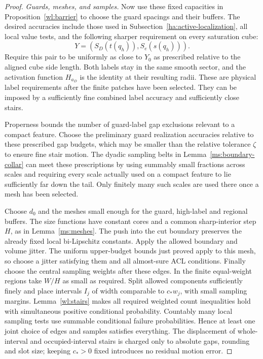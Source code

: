 \documentclass[11pt]{article}
\numberwithin{equation}{section}
\theoremstyle{definition}
\theoremstyle{remark}
\begin{document}
\begin{proof}
\emph{Guards, meshes, and samples.}
Now use these fixed capacities in Proposition~\ref{wl:barrier} to choose
the guard spacings and their buffers.  The desired accuracies include
those used in Subsection~\ref{ha:active-localization}, all local value tests,
and the following sharper requirement on every saturation cube:
\begin{equation}\label{ha:sharp-label-pinning}
                  Y=(S_D(t(q_h)),S_e(s(q_h))).
\end{equation}
Require this pair to be uniformly as close to $Y_0$ as prescribed
relative to the aligned cube side length.  Both labels stay in the
same smooth sector, and the activation
function $H_{a_D}$ is the identity at their resulting radii.
These are physical label requirements after the finite patches
have been selected.  They can be imposed by a sufficiently fine
combined label accuracy and sufficiently close stairs.

Properness bounds the number of guard-label gap exclusions relevant
to a compact feature.  Choose the preliminary guard realization
accuracies relative to these prescribed gap budgets, which may be
smaller than the relative tolerance $\zeta$ to ensure fine stair
motion.  The dyadic sampling belts in
Lemma~\ref{ms:boundary-collar} can meet these prescriptions by
using summably small fractions across scales and requiring every
scale actually used on a compact feature to lie sufficiently far
down the tail.  Only finitely many such scales are used there
once a mesh has been selected.

Choose $d_0$ and the meshes small enough for the guard, high-label
and regional buffers.  The size functions have constant cores and
a common sharp-interior step $H$, as in Lemma~\ref{ms:meshes}.
The push into the cut boundary preserves the already fixed local
bi-Lipschitz constants.  Apply the allowed boundary and volume
jitter.  The uniform upper-budget bounds just proved apply to this
mesh, so choose a jitter satisfying them and all almost-sure ACL
conditions.  Finally choose the central sampling weights after
these edges.  In the finite equal-weight regions take $W/H$ as
small as required.  Split allowed components sufficiently finely
and place intervals $I_j$ of width comparable to $c_*w_j$, with
small sampling margins.  Lemma~\ref{wl:stairs} makes all required
weighted count inequalities hold with simultaneous positive
conditional probability.  Countably many local sampling tests
use summable conditional failure probabilities.  Hence at least
one joint choice of edges and samples satisfies everything.
The displacement of whole-interval and occupied-interval stairs
is charged only to absolute gaps, rounding and slot size; keeping
$c_*>0$ fixed introduces no residual motion error.


\end{proof}
\end{document}
